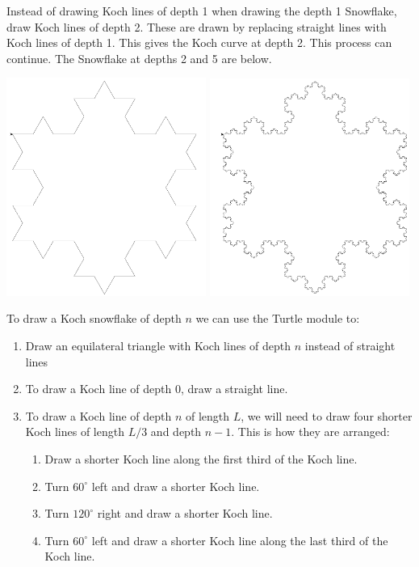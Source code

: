 \documentclass[11pt]{cselabheader}
\begin{document}
Instead of drawing Koch lines of depth 1 when drawing the depth 1
Snowflake, draw Koch lines of depth 2. These are drawn by replacing
straight lines with Koch lines of depth 1. This gives the Koch curve
at depth 2.  This process can continue. The Snowflake at depths 2 and
5 are below.

\begin{center}
\includegraphics[width=0.49\textwidth]{img/koch2.png}
\includegraphics[width=0.49\textwidth]{img/koch5.png}
\end{center}

To draw a Koch snowflake of depth $n$ we can use the Turtle module to:

\begin{enumerate}
\item Draw an equilateral triangle with Koch lines of depth $n$
instead of straight lines
\item To draw a Koch line of depth $0$, draw a straight line.
\item To draw a Koch line of depth $n$ of length $L$, we will need to
draw four shorter Koch lines of length $L / 3$ and depth $n-1$.  This
is how they are arranged:
\begin{enumerate}
\item Draw a shorter Koch line along the first third of the Koch line.
\item Turn $60^\circ$ left and draw a shorter Koch line.
\item Turn $120^\circ$ right and draw a shorter Koch line.
\item Turn $60^\circ$ left and draw a shorter Koch line along the last
third of the Koch line.
\end{enumerate}
\end{enumerate}
\end{document}
